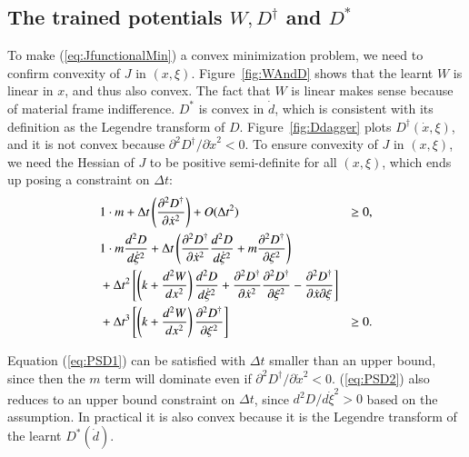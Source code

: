 \subsection{The trained potentials $W, D^\dagger$ and $D^*$}
To make (\ref{eq:JfunctionalMin}) a convex minimization problem, 
we need to confirm convexity of $J$ in $(x, \xi)$. 
Figure~\ref{fig:WAndD} shows that the learnt $W$ is linear in $x$, 
and thus also convex. 
The fact that $W$ is linear makes sense because of material frame indifference.   
$D^*$ is convex in $\dot{d}$, 
which is consistent with its definition as the Legendre transform of $D$. 
Figure~\ref{fig:Ddagger} plots $D^\dagger(\dot{x}, \xi)$, 
and it is not convex because $\partial^2 D^\dagger / \partial \dot{x}^2 < 0$. 
To ensure convexity of $J$ in $(x, \xi)$, 
we need the Hessian of $J$ to be positive semi-definite for all $(x, \xi)$, 
which ends up posing a constraint on $\Delta t$: 
\begin{align}
    &1 \cdot m + \Delta t \left(\frac{\partial^2 D^\dagger}{\partial \dot{x}^2}\right) + O(\Delta t^2)  &\ge 0, \label{eq:PSD1}\\
    & 1 \cdot m \frac{d^2D}{d\dot{\xi}^2} 
    + \Delta t \left(\frac{\partial^2 D^\dagger}{\partial \dot{x}^2} \frac{d^2D}{d\dot{\xi}^2} + m \frac{\partial^2 D^\dagger}{\partial \xi^2}\right) 
    &\notag \\
    & + \Delta t^2 \left[\left(k + \frac{d^2W}{dx^2}\right)\frac{d^2D}{d\dot{\xi}^2} + \frac{\partial^2 D^\dagger}{\partial \dot{x}^2}\frac{\partial^2 D^\dagger}{\partial \xi^2}-\frac{\partial^2D^\dagger}{\partial \dot{x} \partial \xi}\right] 
    &\notag \\
    & + \Delta t^3 \left[\left(k + \frac{d^2W}{dx^2}\right)\frac{\partial^2D^\dagger}{\partial \xi^2}\right] & \ge 0. \label{eq:PSD2}
\end{align}

Equation (\ref{eq:PSD1}) can be satisfied with $\Delta t$ smaller than an upper bound, 
since then the $m$ term will dominate even if $\partial^2 D^\dagger / \partial \dot{x}^2 < 0$. 
(\ref{eq:PSD2}) also reduces to an upper bound constraint on $\Delta t$, 
since $d^2 D / d \dot{\xi}^2 > 0$ based on the assumption. 
In practical it is also convex because it is the Legendre transform of the learnt $D^*(\dot{d})$. 


